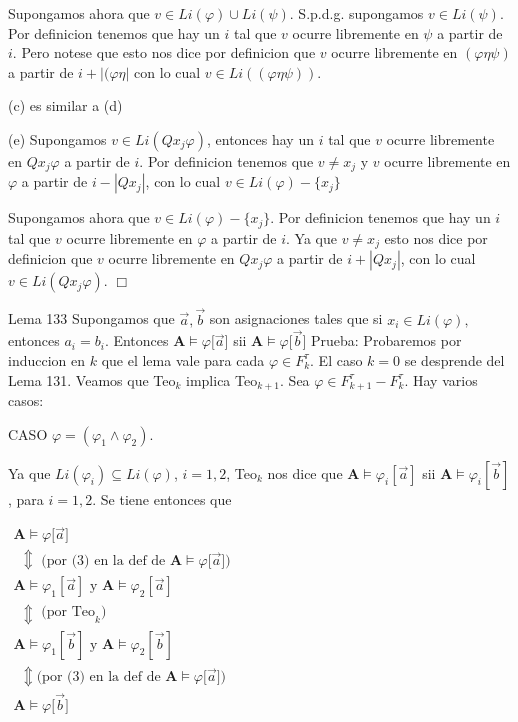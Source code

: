 Supongamos ahora que \(v\in Li(\varphi )\cup Li(\psi )\). S.p.d.g. supongamos \( v\in Li(\psi )\). Por definicion tenemos que hay un \(i\) tal que \(v\) ocurre libremente en \(\psi \) a partir de \(i\). Pero notese que esto nos dice por definicion que \(v\) ocurre libremente en \((\varphi \eta \psi )\) a partir de \( i+\left\vert (\varphi \eta \right\vert \) con lo cual \(v\in Li((\varphi \eta \psi ))\).

(c) es similar a (d)

(e) Supongamos \(v\in Li(Qx_{j}\varphi )\), entonces hay un \(i\) tal que \(v\) ocurre libremente en \(Qx_{j}\varphi \) a partir de \(i\). Por definicion tenemos que \(v\neq x_{j}\) y \(v\) ocurre libremente en \(\varphi \) a partir de \( i-\left\vert Qx_{j}\right\vert \), con lo cual \(v\in Li(\varphi )-\{x_{j}\}\)

Supongamos ahora que \(v\in Li(\varphi )-\{x_{j}\}\). Por definicion tenemos que hay un \(i\) tal que \(v\) ocurre libremente en \(\varphi \) a partir de \(i\). Ya que \(v\neq x_{j}\) esto nos dice por definicion que \(v\) ocurre libremente en \(Qx_{j}\varphi \) a partir de \(i+\left\vert Qx_{j}\right\vert \), con lo cual \(v\in Li(Qx_{j}\varphi )\). \(\Box\)

Lema 133 Supongamos que \(\vec{a},\vec{b}\) son asignaciones tales que si \(x_{i}\in Li(\varphi ),\) entonces \(a_{i}=b_{i}.\) Entonces \( \mathbf{A}\models \varphi \lbrack \vec{a}]\) sii \(\mathbf{A}\models \varphi \lbrack \vec{b}]\)
Prueba: Probaremos por induccion en \(k\) que el lema vale para cada \(\varphi \in F_{k}^{\tau }.\) El caso \(k=0\) se desprende del Lema 131. Veamos que Teo\(_{k}\) implica Teo\(_{k+1}.\) Sea \(\varphi \in F_{k+1}^{\tau }-F_{k}^{\tau }.\) Hay varios casos:

CASO \(\varphi =(\varphi _{1}\wedge \varphi _{2})\).

Ya que \(Li(\varphi _{i})\subseteq Li(\varphi )\), \(i=1,2\), Teo\(_{k}\) nos dice que \(\mathbf{A}\models \varphi _{i}[\vec{a}]\) sii \(\mathbf{A} \models \varphi _{i}[\vec{b}]\), para \(i=1,2\). Se tiene entonces que

\(\displaystyle \begin{array}{l} \mathbf{A}\models \varphi \lbrack \vec{a}] \\ \ \ \Updownarrow \text{ (por (3) en la def de }\mathbf{A}\models \varphi \lbrack \vec{a}]\text{)} \\ \mathbf{A}\models \varphi _{1}[\vec{a}]\text{ y }\mathbf{A}\models \varphi _{2}[\vec{a}] \\ \ \ \Updownarrow \text{ (por Teo}_{k}\text{)} \\ \mathbf{A}\models \varphi _{1}[\vec{b}]\text{ y }\mathbf{A}\models \varphi _{2}[\vec{b}] \\ \ \ \Updownarrow \text{(por (3) en la def de }\mathbf{A}\models \varphi \lbrack \vec{a}]\text{)} \\ \mathbf{A}\models \varphi \lbrack \vec{b}] \end{array} \)


